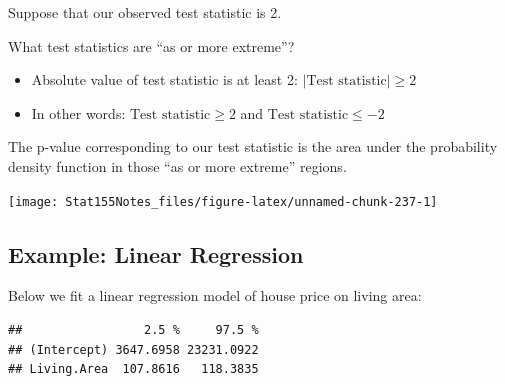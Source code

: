 \documentclass[]{book}
\newenvironment{Shaded}{\begin{snugshade}}{\end{snugshade}}
\newcommand{\CommentTok}[1]{\textcolor[rgb]{0.56,0.35,0.01}{\textit{#1}}}
\newcommand{\DataTypeTok}[1]{\textcolor[rgb]{0.13,0.29,0.53}{#1}}
\newcommand{\KeywordTok}[1]{\textcolor[rgb]{0.13,0.29,0.53}{\textbf{#1}}}
\newcommand{\NormalTok}[1]{#1}
\newcommand{\OperatorTok}[1]{\textcolor[rgb]{0.81,0.36,0.00}{\textbf{#1}}}
\newcommand{\StringTok}[1]{\textcolor[rgb]{0.31,0.60,0.02}{#1}}
\providecommand{\tightlist}{%
  \setlength{\itemsep}{0pt}\setlength{\parskip}{0pt}}
\begin{document}
Suppose that our observed test statistic is 2.

What test statistics are ``as or more extreme''?

\begin{itemize}
\tightlist
\item
  Absolute value of test statistic is at least 2: \(|\text{Test statistic}| \geq 2\)
\item
  In other words: \(\text{Test statistic} \geq 2\) and \(\text{Test statistic} \leq -2\)
\end{itemize}

The p-value corresponding to our test statistic is the area under the probability density function in those ``as or more extreme'' regions.

\begin{center}\texttt{[image: Stat155Notes\_files/figure-latex/unnamed-chunk-237-1]} \end{center}

\hypertarget{example-linear-regression}{%
\subsection{Example: Linear Regression}\label{example-linear-regression}}

Below we fit a linear regression model of house price on living area:

\begin{Shaded}
\end{Shaded}

\begin{verbatim}
##                 2.5 %     97.5 %
## (Intercept) 3647.6958 23231.0922
## Living.Area  107.8616   118.3835
\end{verbatim}

\begin{Shaded}
\end{Shaded}
\end{document}
